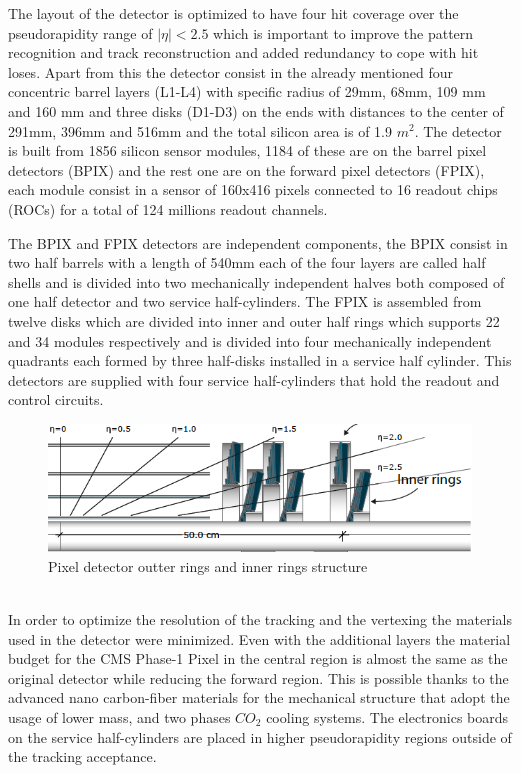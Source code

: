 The layout of the detector is optimized to have four hit coverage over the pseudorapidity range of  $|\eta| < 2.5$ which is important to improve the pattern recognition and track reconstruction and added redundancy to cope with hit loses. Apart from this the detector consist in the already mentioned four concentric barrel layers (L1-L4) with specific radius of 29mm, 68mm, 109 mm and 160 mm and three disks (D1-D3) on the ends with distances to the center of 291mm, 396mm and 516mm and the total silicon area is of 1.9 $m^{2}$. The detector is built from 1856 silicon sensor modules, 1184 of these are on the barrel pixel detectors (BPIX) and the rest one are on the forward pixel detectors (FPIX), each module consist in a sensor of 160x416 pixels connected to 16 readout chips (ROCs) for a total of 124 millions readout channels. \cite{pxd}

The BPIX and FPIX detectors are independent components, the BPIX consist in two half barrels with a length of 540mm each of the four layers are called half shells and is divided into two mechanically independent halves both composed of one half detector and two service half-cylinders. The FPIX is assembled from twelve disks which are divided into inner and outer half rings which supports 22 and 34 modules respectively and is divided into four mechanically independent quadrants each formed by three half-disks installed in a service half cylinder. This detectors are supplied with four service half-cylinders that hold the readout and control circuits.
\\
\begin{figure}[h]
    \centering
    \includegraphics[width=1\textwidth]{pixeldetector.png}     
    \caption{Pixel detector outter rings and inner rings structure}
    \label{fig:PixelDetector}
\end{figure}

\\
In order to optimize the resolution of the tracking and the vertexing the materials used in the detector were minimized. Even with the additional layers the material budget for the CMS Phase-1 Pixel in the central region is almost the same as the original detector while reducing the forward region. This is possible thanks to the advanced nano carbon-fiber materials for the mechanical structure that adopt the usage of lower mass, and two phases $CO_{2}$ cooling systems. The electronics boards on the service half-cylinders are placed in higher pseudorapidity regions outside of the tracking acceptance. 

